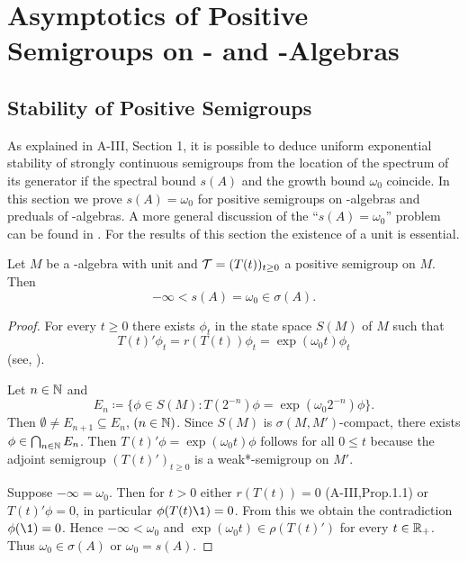 

\chapter{Asymptotics of Positive Semigroups on \CA- and \WA-Algebras}\label{chap:d4}

\section{Stability of Positive Semigroups}\label{sec:d4-1}

As explained in A-III, Section 1, it is possible to deduce uniform exponential stability of strongly continuous semigroups from the location of the spectrum of its generator if the spectral bound $ s(A) $ and the growth bound $ \omega_{0} $ coincide.
In this section we prove $s(A) = \omega_{0}$ for positive semigroups on \CA-algebras and preduals of \WA-algebras.
A more general discussion of the \enquote{$s(A) = \omega_{0}$} problem can be found in \citet{greinervoigtwolff:1981}.
For the results of this section the existence of a unit is essential.
\begin{theorem}\label{thm:d4-1.1}
Let $M$ be a \CA-algebra with unit and $\mathcal{T} = (T(t))_{t \geq 0}$ a positive semigroup on $M$.
Then
\[
	-\infty < s(A) = \omega_{0} \in \sigma(A).
\]
\end{theorem}
\begin{proof}
For every  $t \geq 0 $ there exists $\phi_{t}$ in the state space $S(M)$ of $M$ such that
\[
	T(t)'\phi_{t} = r(T(t))\phi_{t} = \exp(\omega_{0} t)\phi_{t}
\]
(see, \eg \citet[2.1]{groh:1981}).

Let $n \in \mathbb{N}$ and
\[
	E_{n} \coloneqq \{\phi \in S(M) \colon T(2^{-n})\phi = \exp(\omega_{0} 2^{-n})\phi \}.
\]
Then $\emptyset \neq E_{n+1} \subseteq E_{n}$,  $(n \in \mathbb{N})$.
Since $S(M)$ is $\sigma(M,M')$-compact, there exists $\phi \in \bigcap_{n \in \mathbb{N}} E_{n}$.
Then $ T(t)'\phi = \exp(\omega_{0} t)\phi$ follows for all $ 0 \leq t $ because the adjoint semigroup $(T(t)')_{t \geq 0}$ is a weak*-semigroup on $M'$.

Suppose $-\infty = \omega_{0}$.
Then for $t > 0$ either $r(T(t)) = 0$ (A-III,Prop.1.1) or $T(t)'\phi = 0$, in particular $\phi(T(t)\1) = 0$.
From this we obtain the contradiction $\phi(\1) = 0$.
Hence $-\infty < \omega_{0}$ and $\exp(\omega_{0} t) \in \rho(T(t)')$ for every $t \in \mathbb{R}_{+}$.
Thus $\omega_{0} \in \sigma(A)$ or $\omega_{0} = s(A)$.
\end{proof}
